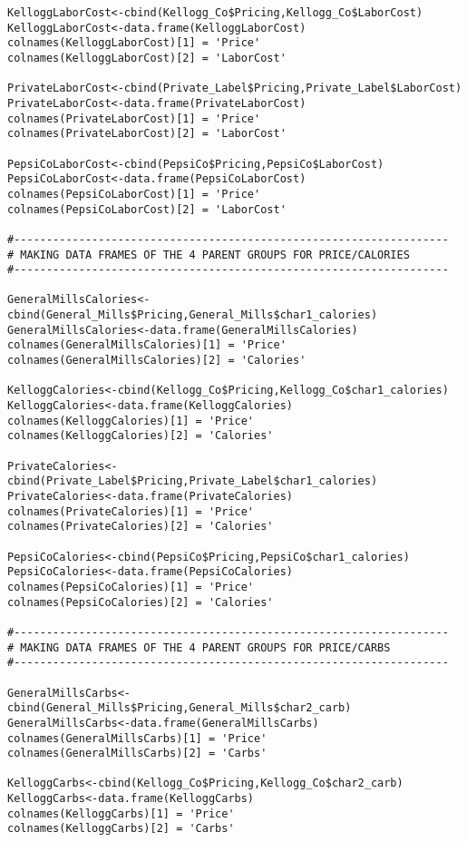 \documentclass[12pt,english]{article}
\begin{document}
\begin{lstlisting}
KelloggLaborCost<-cbind(Kellogg_Co$Pricing,Kellogg_Co$LaborCost)
KelloggLaborCost<-data.frame(KelloggLaborCost)
colnames(KelloggLaborCost)[1] = 'Price'
colnames(KelloggLaborCost)[2] = 'LaborCost'

PrivateLaborCost<-cbind(Private_Label$Pricing,Private_Label$LaborCost)
PrivateLaborCost<-data.frame(PrivateLaborCost)
colnames(PrivateLaborCost)[1] = 'Price'
colnames(PrivateLaborCost)[2] = 'LaborCost'

PepsiCoLaborCost<-cbind(PepsiCo$Pricing,PepsiCo$LaborCost)
PepsiCoLaborCost<-data.frame(PepsiCoLaborCost)
colnames(PepsiCoLaborCost)[1] = 'Price'
colnames(PepsiCoLaborCost)[2] = 'LaborCost'

#-------------------------------------------------------------------
# MAKING DATA FRAMES OF THE 4 PARENT GROUPS FOR PRICE/CALORIES
#-------------------------------------------------------------------

GeneralMillsCalories<-cbind(General_Mills$Pricing,General_Mills$char1_calories)
GeneralMillsCalories<-data.frame(GeneralMillsCalories)
colnames(GeneralMillsCalories)[1] = 'Price'
colnames(GeneralMillsCalories)[2] = 'Calories'

KelloggCalories<-cbind(Kellogg_Co$Pricing,Kellogg_Co$char1_calories)
KelloggCalories<-data.frame(KelloggCalories)
colnames(KelloggCalories)[1] = 'Price'
colnames(KelloggCalories)[2] = 'Calories'

PrivateCalories<-cbind(Private_Label$Pricing,Private_Label$char1_calories)
PrivateCalories<-data.frame(PrivateCalories)
colnames(PrivateCalories)[1] = 'Price'
colnames(PrivateCalories)[2] = 'Calories'

PepsiCoCalories<-cbind(PepsiCo$Pricing,PepsiCo$char1_calories)
PepsiCoCalories<-data.frame(PepsiCoCalories)
colnames(PepsiCoCalories)[1] = 'Price'
colnames(PepsiCoCalories)[2] = 'Calories'

#-------------------------------------------------------------------
# MAKING DATA FRAMES OF THE 4 PARENT GROUPS FOR PRICE/CARBS
#-------------------------------------------------------------------

GeneralMillsCarbs<-cbind(General_Mills$Pricing,General_Mills$char2_carb)
GeneralMillsCarbs<-data.frame(GeneralMillsCarbs)
colnames(GeneralMillsCarbs)[1] = 'Price'
colnames(GeneralMillsCarbs)[2] = 'Carbs'

KelloggCarbs<-cbind(Kellogg_Co$Pricing,Kellogg_Co$char2_carb)
KelloggCarbs<-data.frame(KelloggCarbs)
colnames(KelloggCarbs)[1] = 'Price'
colnames(KelloggCarbs)[2] = 'Carbs'


\end{lstlisting}
\end{document}

